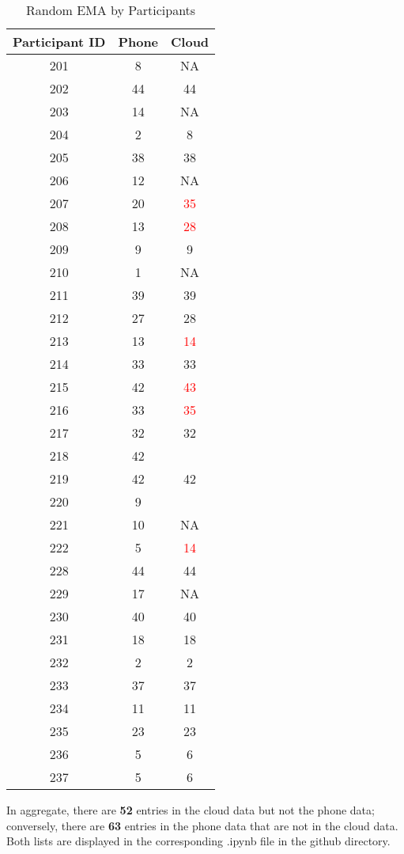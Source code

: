 \documentclass[11pt]{article}
\begin{document}
\begin{table}[htb]
\centering
\begin{tabular}{|c|c|c|} 
 \hline
Participant ID & Phone & Cloud \\
 \hline
 201 & 8 & NA \\
 \hline
 202 &  44 & 44 \\
 \hline
 203 & 14 & NA \\
 \hline
 204 & 2 & 8 \\
\hline  
205 & 38 & 38 \\
\hline
206& 12 & NA \\
\hline
207 & 20 & \textcolor{red}{35} \\
\hline
208 & 13 & \textcolor{red}{28} \\
\hline
209 & 9 &  9 \\
\hline
210 & 1 & NA \\
\hline
211 & 39 & 39 \\
\hline
212 & 27 & 28 \\
\hline
213 & 13 & \textcolor{red}{14} \\
\hline
214 & 33 & 33 \\
\hline
215 & 42 & \textcolor{red}{43} \\
\hline
216 & 33 & \textcolor{red}{35} \\
\hline
217 & 32 & 32 \\
\hline
218 & 42 & \textcolor{43} \\
\hline
219 & 42 & 42 \\
\hline
220 & 9 & \textcolor{10} \\
\hline
221 & 10 & NA \\
\hline
222 & 5 & \textcolor{red}{14} \\
\hline
228 & 44 & 44 \\
\hline
229 & 17 & NA \\
\hline
230 & 40 & 40 \\
\hline
231 & 18 & 18 \\
\hline
232 & 2 & 2 \\
\hline
233 & 37 & 37 \\
\hline
234 & 11 & 11 \\
\hline
235 & 23 & 23 \\
\hline
236 & 5 & 6 \\
\hline
237 & 5 & 6 \\
\hline
\end{tabular}
\caption{Random EMA by Participants}
\label{table:4}
\end{table}
  In aggregate, there are \textbf{52} entries in the cloud data but not the phone data; conversely, there are \textbf{63} entries in the phone data that are not in the cloud data.  Both lists are displayed in the corresponding .ipynb file in the github directory.
\end{document}
